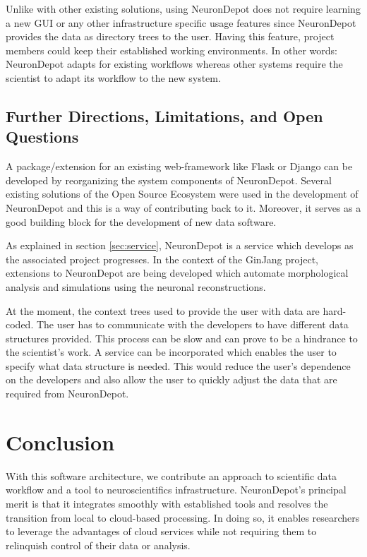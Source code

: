 \documentclass{frontiersSCNS} %
\begin{document}
Unlike with other existing solutions, using NeuronDepot does not require
learning a new GUI or any other infrastructure specific usage features since
NeuronDepot provides the data as directory trees to the user. Having this
feature, project members could keep their established working environments. In
other words: NeuronDepot adapts for existing workflows whereas other systems
require the scientist to adapt its workflow to the new system.

\subsection{Further Directions, Limitations, and Open Questions}

A package/extension for an existing web-framework like Flask or Django can be
developed by reorganizing the system components of NeuronDepot. Several
existing solutions of the Open Source Ecosystem were used in the development of
NeuronDepot and this is a way of contributing back to it. Moreover, it
serves as a good building block for the development of new data software.

As explained in section \ref{sec:service}, NeuronDepot is a service which
develops as the associated project progresses. In the context of the GinJang
project, extensions to NeuronDepot are being developed which automate
morphological analysis and simulations using the neuronal reconstructions.

At the moment, the context trees used to provide the user with data are
hard-coded. The user has to communicate with the developers to have different
data structures provided. This process can be slow and can prove to be a
hindrance to the scientist's work. A service can be incorporated which enables
the user to specify what data structure is needed. This would reduce the user's
dependence on the developers and also allow the user to quickly adjust the data
that are required from NeuronDepot.

\section{Conclusion}
With this software architecture, we contribute an approach to scientific data
workflow and a tool to neuroscientifics infrastructure. NeuronDepot's
principal merit is that it integrates smoothly with established tools and
resolves the transition from local to cloud-based processing. In doing so,
it enables researchers to leverage the advantages of cloud services while not
requiring them to relinquish control of their data or analysis.
\end{document}
